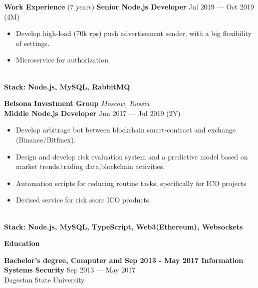 \documentclass{resume} %
\begin{document}
\begin{rSection}{\textbf{Work Experience} (7 years) }
\textbf{Senior Node.js Developer} \hfill Jul 2019 --- Oct 2019 (4M)
\begin{itemize}
    \setlength\itemsep{-0.4em}
    \item Develop high-load (70k rps) push advertisement sender, with a big flexibility of settings.
    \item Microservice for authorization
\end{itemize}
\\\textbf{Stack: Node.js, MySQL, RabbitMQ}

\textbf{Belsona Investment Group} \hfill \textit{Moscow, Russia} \\
\textbf{Middle Node.js Developer}  \hfill Jun 2017 --- Jul 2019 (2Y)

\begin{itemize}
    \setlength\itemsep{-0.4em}
    \item Develop arbitrage bot between blockchain smart-contract and exchange (Binance/Bitfinex).
    \item Design and develop risk evaluation system and a predictive model based on market trends,trading data,blockchain activities.
    \item Automation scripts for reducing routine tasks, specifically for ICO projects
    \item Devised service for risk score ICO products.
\end{itemize}
\\\textbf{Stack: Node.js, MySQL, TypeScript, Web3(Ethereum), Websockets}

\end{rSection}



\begin{rSection}{\textbf{Education}}

\textbf{Bachelor's degree, Computer and Sep 2013 - May 2017 Information Systems Security} \hfill {Sep 2013 --- May 2017} \\
	  Dagestan State University

\end{rSection}
\end{document}
